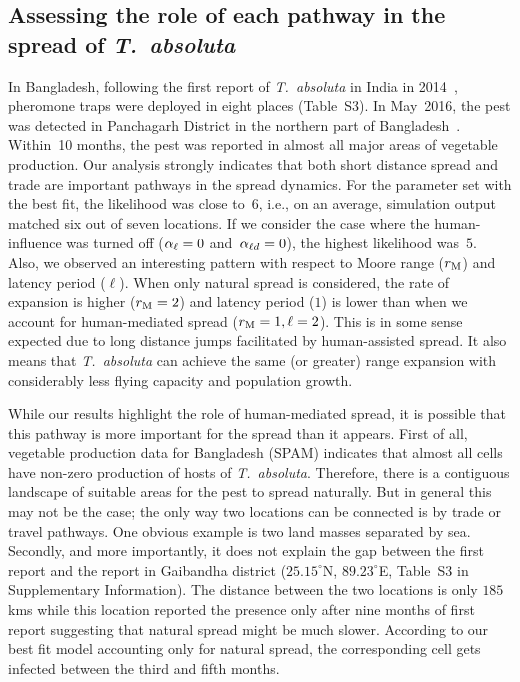 \documentclass[11pt]{article}
\newcommand{\tuta}{\emph{T.~absoluta}}
\theoremstyle{definition}
\begin{document}
\subsection{Assessing the role of each pathway in the spread of \tuta{}}
In Bangladesh, following the first report of \tuta{} in India in
2014~\cite{kalleshwaraswamy2015occurrence}, pheromone traps were deployed
in eight places (Table~S3). In May~2016, the
pest was detected in Panchagarh District in the northern part of
Bangladesh~\cite{hossain2016first}. Within~10 months, the pest was reported
in almost all major areas of vegetable production.
Our analysis strongly indicates that both short distance spread and trade
are important pathways in the spread dynamics. For the parameter set with
the best fit, the likelihood was close to~$6$, i.e., on an average,
simulation output matched six out of seven locations. If we consider the
case where the human-influence was turned off ($\alpha_{\ell}=0$ and~$\alpha_{\ell d}=0$), the
highest likelihood was~$5$. Also, we observed an interesting pattern with
respect to Moore range ($r_\mathrm{M}$) and latency period ($\ell$). When
only natural spread is considered, the rate of expansion is higher
($r_\mathrm{M}=2$) and latency period ($1$) is lower than when we account
for human-mediated spread ($r_\mathrm{M}=1,\ell=2$).  This is in some sense
expected due to long distance jumps facilitated by human-assisted spread.
It also means that \tuta{} can achieve the same (or greater) range
expansion with considerably less flying capacity and population growth.

While our results highlight the role of human-mediated spread, it is
possible that this pathway is more important for the spread than it
appears.  First of all, vegetable production data for Bangladesh (SPAM)
indicates that almost all cells have non-zero production of hosts of
\tuta{}. Therefore, there is a contiguous landscape of suitable areas for
the pest to spread naturally. But in general this may not be the case; the
only way two locations can be connected is by trade or travel pathways. One
obvious example is two land masses separated by sea.  Secondly, and more
importantly, it does not explain the gap between the first report and the
report in Gaibandha district ($25.15^\circ$N, $89.23^\circ$E, Table~S3
in Supplementary Information). The distance between the two locations is
only $185$kms while this location reported the presence only after nine
months of first report suggesting that natural spread might be much slower.
According to our best fit model accounting only for natural spread, the
corresponding cell gets infected between the third and fifth months.
\end{document}
